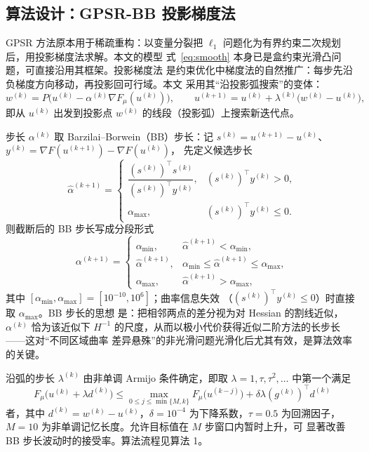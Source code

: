 \documentclass[withoutpreface,bwprint]{cumcmthesis}
\begin{document}
\subsection{算法设计：GPSR-BB 投影梯度法}

GPSR 方法\cite{figueiredo2008}原本用于稀疏重构：以变量分裂把
$\ell_1$ 问题化为有界约束二次规划后，用投影梯度法求解。本文的模型
式~\eqref{eq:smooth} 本身已是盒约束光滑凸问题，可直接沿用其框架。投影梯度法
是约束优化中梯度法的自然推广：每步先沿负梯度方向移动，再投影回可行域。本文
采用其``沿投影弧搜索''的变体：
\begin{equation}
  w^{(k)}=P\big(u^{(k)}-\alpha^{(k)}\nabla F_{\mu}(u^{(k)})\big),\qquad
  u^{(k+1)}=u^{(k)}+\lambda^{(k)}\big(w^{(k)}-u^{(k)}\big),
  \label{eq:pgd}
\end{equation}
即从 $u^{(k)}$ 出发到投影点 $w^{(k)}$ 的线段（投影弧）上搜索新迭代点。

步长 $\alpha^{(k)}$ 取 Barzilai--Borwein（BB）步长：记
$s^{(k)}=u^{(k+1)}-u^{(k)}$、$y^{(k)}=\nabla F(u^{(k+1)})-\nabla F(u^{(k)})$，
先定义候选步长
\[
  \widehat\alpha^{(k+1)}=
  \begin{cases}
    \dfrac{(s^{(k)})^{\!\top}s^{(k)}}{(s^{(k)})^{\!\top}y^{(k)}},
      & (s^{(k)})^{\!\top}y^{(k)}>0,\\[6pt]
    \alpha_{\max}, & (s^{(k)})^{\!\top}y^{(k)}\le0.
  \end{cases}
\]
则截断后的 BB 步长写成分段形式
\begin{equation}
  \alpha^{(k+1)}=
  \begin{cases}
    \alpha_{\min}, & \widehat\alpha^{(k+1)}<\alpha_{\min},\\[2pt]
    \widehat\alpha^{(k+1)}, &
      \alpha_{\min}\le\widehat\alpha^{(k+1)}\le\alpha_{\max},\\[2pt]
    \alpha_{\max}, & \widehat\alpha^{(k+1)}>\alpha_{\max},
  \end{cases}
  \label{eq:bb}
\end{equation}
其中 $[\alpha_{\min},\alpha_{\max}]=[10^{-10},10^{6}]$；曲率信息失效
（$(s^{(k)})^{\!\top}y^{(k)}\le0$）时直接取 $\alpha_{\max}$。BB 步长的思想
是：把相邻两点的差分视为对 Hessian 的割线近似，$\alpha^{(k)}$ 恰为该近似下
$H^{-1}$ 的尺度，从而以极小代价获得近似二阶方法的长步长——这对``不同区域曲率
差异悬殊''的非光滑问题光滑化后尤其有效，是算法效率的关键。

沿弧的步长 $\lambda^{(k)}$ 由非单调 Armijo 条件确定，即取
$\lambda=1,\tau,\tau^{2},\dots$ 中第一个满足
\begin{equation}
  F_{\mu}\big(u^{(k)}+\lambda d^{(k)}\big)\le
  \max_{0\le j\le \min\{M,k\}}F_{\mu}\big(u^{(k-j)}\big)+\delta\lambda(g^{(k)})^{\!\top}d^{(k)}
  \label{eq:armijo}
\end{equation}
者，其中 $d^{(k)}=w^{(k)}-u^{(k)}$，$\delta=10^{-4}$ 为下降系数，$\tau=0.5$
为回溯因子，$M=10$ 为非单调记忆长度。允许目标值在 $M$ 步窗口内暂时上升，可
显著改善 BB 步长波动时的接受率。算法流程见算法 1。
\end{document}
